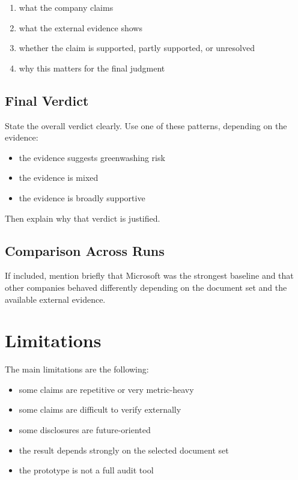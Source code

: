 \begin{enumerate}
    \item what the company claims
    \item what the external evidence shows
    \item whether the claim is supported, partly supported, or unresolved
    \item why this matters for the final judgment
\end{enumerate}

\subsection{Final Verdict}

State the overall verdict clearly. Use one of these patterns, depending on the evidence:

\begin{itemize}
    \item the evidence suggests greenwashing risk
    \item the evidence is mixed
    \item the evidence is broadly supportive
\end{itemize}

Then explain why that verdict is justified.

\subsection{Comparison Across Runs}

If included, mention briefly that Microsoft was the strongest baseline and that other companies behaved differently depending on the document set and the available external evidence.

\section{Limitations}

The main limitations are the following:

\begin{itemize}
    \item some claims are repetitive or very metric-heavy
    \item some claims are difficult to verify externally
    \item some disclosures are future-oriented
    \item the result depends strongly on the selected document set
    \item the prototype is not a full audit tool
\end{itemize}

